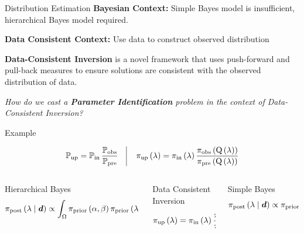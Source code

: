\begin{block}{Distribution Estimation}
\centering
            {\large \textbf{Bayesian Context:} Simple Bayes model is insufficient, hierarchical Bayes model required.}
           
           {\large \textbf{Data Consistent Context:} Use data to construct observed distribution}

             {\large \textbf{Data-Consistent Inversion} is a novel framework that uses push-forward and pull-back measures to ensure solutions are consistent with the observed distribution of data.}

             {\large \emph{How do we cast a \textbf{Parameter Identification} problem in the context of Data-Consistent Inversion?} }

\end{block}


\begin{block}{Example}

\centering
\vspace{1cm}
    \begin{equation*}
            \dciP \quad \vline \quad \dci
    \end{equation*}
    


\begin{columns}
\begin{column}{\textwidth}
    Hierarchical Bayes
    \begin{equation*}
    \Hbayes
    \end{equation*}
    
\end{column}
\begin{column}{\textwidth}
  Data Consistent Inversion  
    \begin{equation*}
           \dci
    \end{equation*}
\end{column}

\begin{column}{\textwidth}
  Simple Bayes
    \begin{equation*}
           \bayes
    \end{equation*}
\end{column}
\separatorcolumn
\end{columns}


\end{block}





